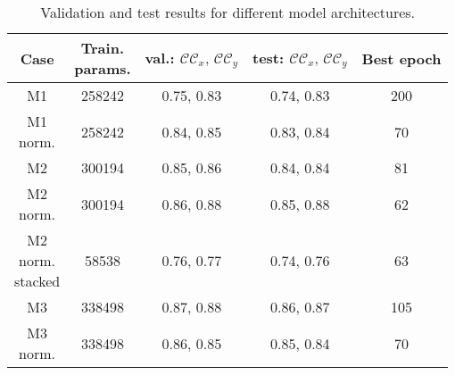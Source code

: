 \documentclass[../main.tex]{subfiles}
\begin{document}
{\renewcommand{\arraystretch}{1.2}
\begin{table}[t]
\begin{center}
\begin{tabular}{ccccc}
\toprule
Case & \specialcell{Train.\\params.} & val.: $\mathcal{CC}_x,\,\mathcal{CC}_y$ & test: $\mathcal{CC}_x,\,\mathcal{CC}_y$ & Best epoch\\
\midrule
M1 & 258242 & 0.75, 0.83 &  0.74, 0.83 & 200\\
\specialcell{M1\\norm.} & 258242 & 0.84, 0.85 & 0.83, 0.84 & 70\\
M2 & 300194 & 0.85, 0.86 & 0.84, 0.84 & 81\\
\specialcell{M2\\norm.} & 300194 & {0.86, 0.88} & {0.85, 0.88}& 62\\
\specialcell{M2\\norm.\\stacked} & 58538 & 0.76, 0.77 &  0.74, 0.76 & 63\\
M3 & 338498 & 0.87, 0.88 & 0.86, 0.87 & 105\\
\specialcell{M3\\norm.} & 338498 & 0.86, 0.85 & 0.85, 0.84 & 70\\
\bottomrule
\end{tabular}
\end{center}
\caption{Validation and test results for different model architectures.}
\label{tab:models_correlation}
\end{table}}
\end{document}
